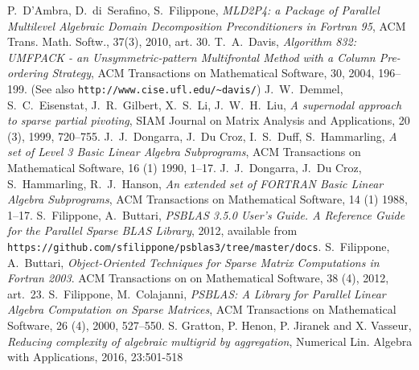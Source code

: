 \begin{thebibliography}{99}
%
P.~D'Ambra, D.~di~Serafino, S.~Filippone,
\emph{MLD2P4: a Package of Parallel Multilevel
Algebraic Domain Decomposition Preconditioners
in Fortran 95},  ACM Trans. Math. Softw., 37(3), 2010, art. 30.
%
T.~A.~Davis, 
{\em Algorithm 832: UMFPACK - an Unsymmetric-pattern Multifrontal
Method with a Column Pre-ordering Strategy},
ACM Transactions on Mathematical Software, 30, 2004, 196--199.
(See also \texttt{http://www.cise.ufl.edu/{\textasciitilde}davis/})
%
J.~W.~Demmel, S.~C.~Eisenstat, J.~R.~Gilbert, X.~S.~Li, J.~W.~H.~Liu,
{\em A supernodal approach to sparse partial pivoting},
SIAM Journal on Matrix Analysis and Applications, 20 (3), 1999, 720--755.
%
J.~J.~Dongarra, J.~Du Croz, I.~S.~Duff, S.~Hammarling,
\emph{A set of Level 3 Basic Linear Algebra Subprograms},
ACM Transactions on Mathematical Software, 16 (1) 1990, 1--17.
%
J.~J.~Dongarra, J.~Du Croz, S.~Hammarling, R.~J.~Hanson,
\emph{An extended set of FORTRAN Basic Linear Algebra Subprograms},
ACM Transactions on Mathematical Software, 14 (1) 1988, 1--17.
%
%
%
S.~Filippone, A.~Buttari, 
{\em PSBLAS 3.5.0 User's Guide. A Reference Guide for the Parallel Sparse BLAS Library}, 2012,
available from \texttt{https://github.com/sfilippone/psblas3/tree/master/docs}.
%
S.~Filippone, A.~Buttari,
{\em Object-Oriented Techniques for Sparse Matrix Computations in Fortran 2003}.
ACM Transactions on on Mathematical Software, 38 (4), 2012, art.~23.
%
S.~Filippone, M.~Colajanni, 
{\em PSBLAS: A Library for Parallel Linear Algebra
Computation on Sparse Matrices},
ACM Transactions on Mathematical Software, 26 (4), 2000, 527--550.
%
S. Gratton, P. Henon, P. Jiranek and X. Vasseur,
  {\em Reducing complexity of algebraic multigrid by aggregation}, 
Numerical Lin. Algebra with Applications, 2016, 23:501-518


\end{thebibliography}
